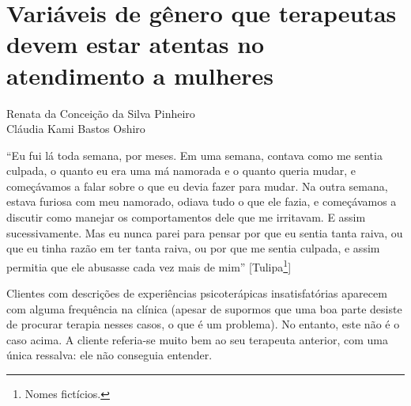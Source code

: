 \setcounter{footnote}{0}
\setcounter{figure}{0}
\setcounter{table}{0}
\chapter*{Variáveis de gênero que terapeutas devem estar atentas no atendimento a mulheres}
\begin{flushright}
\begin{small}
Renata da Conceição da Silva Pinheiro\\
Cláudia Kami Bastos Oshiro\\
\end{small}
\vspace{1cm}
\end{flushright}

``Eu fui lá toda semana, por meses. Em uma semana, contava como me sentia culpada, o quanto eu era uma má namorada e o quanto queria mudar, e começávamos a falar sobre o que eu devia fazer para mudar. Na outra semana, estava furiosa com meu namorado, odiava tudo o que ele fazia, e começávamos a discutir como manejar os comportamentos dele que me irritavam. E assim sucessivamente. Mas eu nunca parei para pensar por que eu sentia tanta raiva, ou que eu tinha razão em ter tanta raiva, ou por que me sentia culpada, e assim permitia que ele abusasse cada vez mais de mim'' [Tulipa\footnote{Nomes fictícios.}]

Clientes com descrições de experiências psicoterápicas insatisfatórias aparecem com alguma frequência na clínica (apesar de supormos que uma boa parte desiste de procurar terapia nesses casos, o que é um problema). No entanto, este não é o caso acima. A cliente referia-se muito bem ao seu terapeuta anterior, com uma única ressalva: ele não conseguia entender. 

